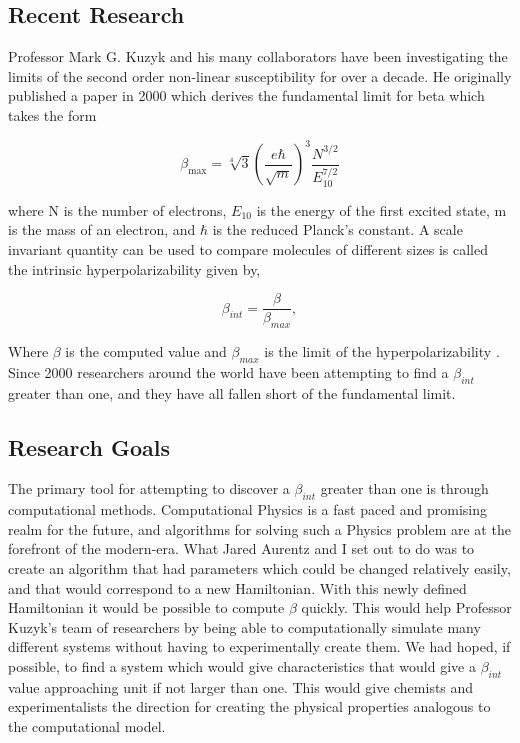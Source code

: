 \documentclass{report}
\theoremstyle{definition}
\begin{document}
\subsection*{Recent Research}

Professor Mark G. Kuzyk and his many collaborators have been investigating the limits of the second order non-linear susceptibility for over a decade. He originally published a paper in 2000 which derives the fundamental limit for beta which takes the form \cite{zhou2007}

\begin{equation}
\beta_{\max} = \sqrt[4]{3} {\left( \frac{e\hbar}{\sqrt{m}} \right)\!\!}^3 \frac{N^{3/2}}{E_{10}^{7/2}}    
\end{equation}

\noindent where N is the number of electrons, $E_{10}$ is the energy of the first excited state, m is the mass of an electron, and $\hbar$ is the reduced Planck's constant. A scale invariant quantity can be used to compare molecules of different sizes is called the intrinsic hyperpolarizability given by, 

\begin{equation}
\beta_{int} = \frac{\beta}{\beta_{max}},
\end{equation}

\noindent Where $\beta$ is the computed value and $\beta_{max}$ is the limit of the hyperpolarizability \cite{kuzyk2000physical}. Since 2000 researchers around the world have been attempting to find a $\beta_{int}$ greater than one, and they have all fallen short of the fundamental limit. %


\subsection*{Research Goals}

The primary tool for attempting to discover a $\beta_{int}$ greater than one is through computational methods. Computational Physics is a fast paced and promising realm for the future, and algorithms for solving such a Physics problem are at the forefront of the modern-era.  What Jared Aurentz and I set out to do was to create an algorithm that had parameters which could be changed relatively easily, and that would correspond to a new Hamiltonian. With this newly defined Hamiltonian it would be possible to compute $\beta$ quickly. This would help Professor Kuzyk's team of researchers by being able to computationally simulate many different systems without having to experimentally create them. We had hoped, if possible, to find a system which would give characteristics that would give a $\beta_{int}$ value approaching unit if not larger than one. This would give chemists and experimentalists the direction for creating the physical properties analogous to the computational model. 
\end{document}
